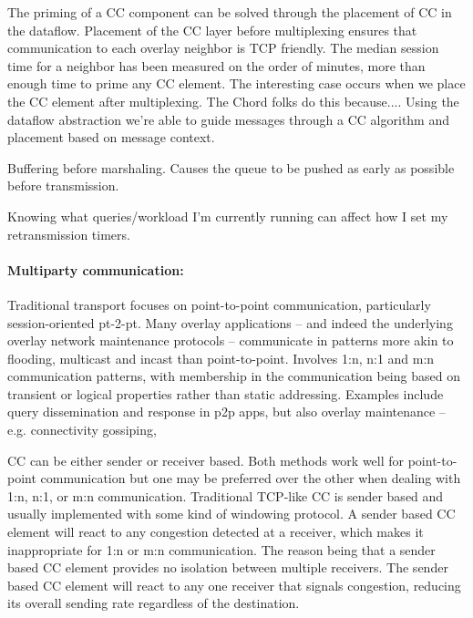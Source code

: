 The priming of a CC component can be solved through the placement of CC 
in the dataflow. Placement of the CC layer before multiplexing ensures that communication to each overlay neighbor is TCP friendly. The median session 
time for a neighbor has been measured on the order of minutes, more than 
enough time to prime any CC element. The interesting case occurs when we
place the CC element after multiplexing. The Chord folks do this because....
Using the dataflow abstraction we're able to guide messages through a
CC algorithm and placement based on message context.

 Buffering before
marshaling.  Causes the queue to be pushed as early as possible before
transmission.

 Knowing what queries/workload I'm currently running
can affect how I set my retransmission timers.


\paragraph{Multiparty communication:} 
Traditional transport focuses on point-to-point communication,
particularly session-oriented pt-2-pt.  Many overlay applications --
and indeed the underlying overlay network maintenance protocols --
communicate in patterns more akin to flooding, multicast and incast
than point-to-point.  Involves 1:n, n:1 and m:n communication
patterns, with membership in the communication being based on
transient or logical properties rather than static
addressing. Examples include query dissemination and response in p2p
apps, but also overlay maintenance -- e.g. connectivity gossiping,
  

CC can be either sender or receiver based. Both methods work well for point-to-point
communication but one may be preferred over the other when dealing with 1:n, n:1, 
or m:n communication. Traditional TCP-like CC is sender based and usually
implemented with some kind of windowing protocol. A sender based CC element
will react to any congestion detected at a receiver, which makes it inappropriate 
for 1:n or m:n communication. The reason being that a sender based CC element 
provides no isolation between multiple receivers. The sender based CC element will
react to any one receiver that signals congestion, reducing its overall sending rate
regardless of the destination.

